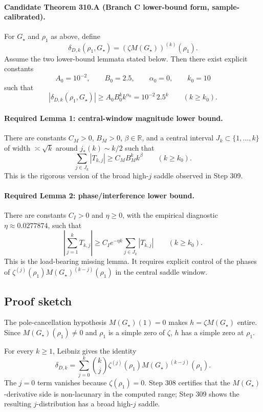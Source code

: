 \paragraph{Candidate Theorem 310.A (Branch C lower-bound form, sample-calibrated).}
For \(G_\star\) and \(\rho_1\) as above, define
\[
  \delta_{D,k}(\rho_1,G_\star)
  =
  \left(\zeta M(G_\star)\right)^{(k)}(\rho_1).
\]
Assume the two lower-bound lemmata stated below.  Then there exist
explicit constants
\[
  A_0=10^{-2},\qquad B_0=2.5,\qquad \alpha_0=0,\qquad k_0=10
\]
such that
\[
  |\delta_{D,k}(\rho_1,G_\star)|
  \ge A_0 B_0^k k^{\alpha_0}
  =
  10^{-2}\,2.5^k
  \qquad (k\ge k_0).
\]

\paragraph{Required Lemma 1: central-window magnitude lower bound.}
There are constants \(C_M>0\), \(B_M>0\), \(\beta\in\mathbb R\), and a
central interval \(J_k\subset \{1,\ldots,k\}\) of width \(\asymp\sqrt{k}\)
around \(j_\ast(k)\sim k/2\) such that
\[
  \sum_{j\in J_k}|T_{k,j}|
  \ge C_M B_M^k k^\beta
  \qquad(k\ge k_0).
\]
This is the rigorous version of the broad high-\(j\) saddle observed in
Step 309.

\paragraph{Required Lemma 2: phase/interference lower bound.}
There are constants \(C_I>0\) and \(\eta\ge0\), with the empirical
diagnostic \(\eta\approx0.0277874\), such that
\[
  \left|\sum_{j=1}^kT_{k,j}\right|
  \ge
  C_I e^{-\eta k}\sum_{j\in J_k}|T_{k,j}|
  \qquad(k\ge k_0).
\]
This is the load-bearing missing lemma.  It requires explicit control of
the phases of
\(\zeta^{(j)}(\rho_1)M(G_\star)^{(k-j)}(\rho_1)\) in the central saddle
window.

\subsection*{Proof sketch}

The pole-cancellation hypothesis \(M(G_\star)(1)=0\) makes
\(h=\zeta M(G_\star)\) entire.  Since \(M(G_\star)(\rho_1)\neq0\) and
\(\rho_1\) is a simple zero of \(\zeta\), \(h\) has a simple zero at
\(\rho_1\).

For every \(k\ge1\), Leibniz gives the identity
\[
  \delta_{D,k}
  =
  \sum_{j=0}^k {k\choose j}
  \zeta^{(j)}(\rho_1)M(G_\star)^{(k-j)}(\rho_1).
\]
The \(j=0\) term vanishes because \(\zeta(\rho_1)=0\).  Step 308
certifies that the \(M(G_\star)\)-derivative side is non-lacunary in the
computed range; Step 309 shows the resulting \(j\)-distribution has a
broad high-\(j\) saddle.

